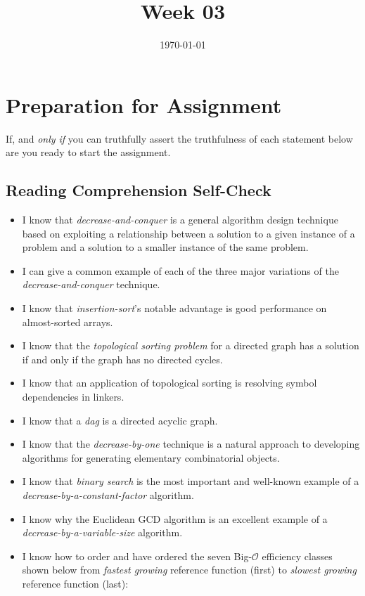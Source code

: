 \documentclass[12pt]{amsart}
\title{Week 03}
\date{\today}
\begin{document}
\maketitle

\section{Preparation for Assignment}
If, and \textit{only if} you can truthfully assert the truthfulness of each statement below are you ready to start the assignment.
\subsection {Reading Comprehension Self-Check}
\begin{itemize}
\item  I know that \textit{decrease-and-conquer} is a general algorithm design technique based on exploiting a relationship between a solution to a given instance of a problem and a solution to a smaller instance of the same problem.
\item  I can give a common example of each of the three major variations of the \textit{decrease-and-conquer} technique.
\item  I know that \textit{insertion-sort}'s notable advantage is good performance on almost-sorted arrays.
\item  I know that the \textit{topological sorting problem} for a directed graph has a solution if and only if the graph has no directed cycles.
\item  I know that an application of topological sorting is resolving symbol dependencies in linkers.
\item  I know that a \textit{dag} is a directed acyclic graph.
\item  I know that the \textit{decrease-by-one} technique is a natural approach to developing algorithms for generating elementary combinatorial objects.
\item  I know that \textit{binary search} is the most important and well-known example of a \textit{decrease-by-a-constant-factor} algorithm.
\item  I know why the Euclidean GCD algorithm is an excellent example of a \textit{decrease-by-a-variable-size} algorithm.
\item  I know how to order and have ordered the seven Big-$\mathcal{O}$ efficiency classes shown below from \textit{fastest growing} reference function (first) to \textit{slowest growing} reference function (last):

\end{itemize}
\end{document}
